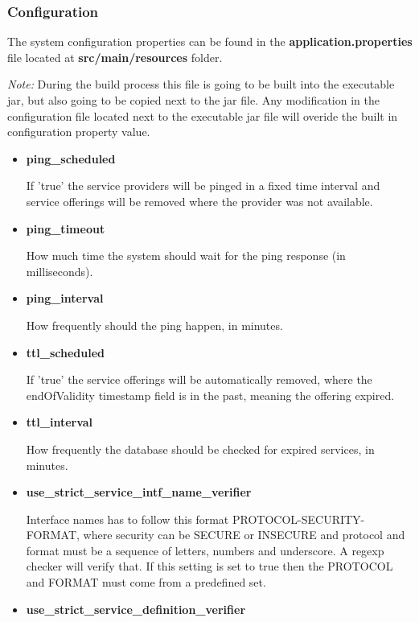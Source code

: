 \documentclass[a4paper]{arrowhead}
\begin{document}
\subsubsection{Configuration}
The system configuration properties can be found in the \textbf{application.properties} file located at \textbf{src/main/resources} folder.

\textit{Note:} During the build process this file is going to be built into the executable jar, but also going to be copied next to the jar file. Any modification in the configuration file located next to the executable jar file will overide the built in configuration property value.

\begin{itemize}
    \item \textbf{ping\_scheduled}
  
    If 'true' the service providers will be pinged in a fixed time interval and service offerings will be removed where the provider was not available.
    
    \item \textbf{ping\_timeout}
  
    How much time the system should wait for the ping response (in milliseconds).
    
    \item \textbf{ping\_interval}
  
    How frequently should the ping happen, in minutes.
    
    \item \textbf{ttl\_scheduled}
  
    If 'true' the service offerings will be automatically removed, where the endOfValidity timestamp field is in the past, meaning the offering expired.
    
    \item \textbf{ttl\_interval}
  
    How frequently the database should be checked for expired services, in minutes.
    
    \item \textbf{use\_strict\_service\_intf\_name\_verifier}
  
    Interface names has to follow this format PROTOCOL-SECURITY-FORMAT, where security can be SECURE or INSECURE and protocol and format must be a sequence of letters, numbers and underscore. A regexp checker will verify that. If this setting is set to true then the PROTOCOL and FORMAT must come from a predefined set.
    
    \item \textbf{use\_strict\_service\_definition\_verifier}
  

\end{itemize}
\end{document}

